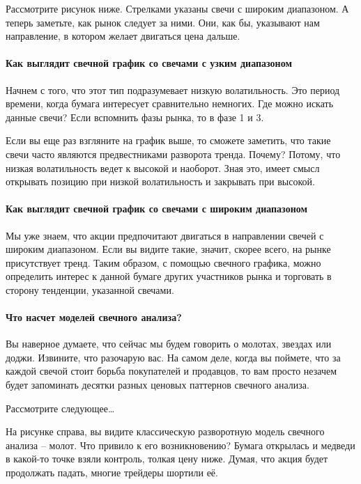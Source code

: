 \documentclass{book}
\begin{document}
Рассмотрите рисунок ниже. Стрелками указаны свечи с широким
диапазоном. А теперь заметьте, как рынок следует за ними. Они, как бы,
указывают нам направление, в котором желает двигаться цена дальше.

\paragraph{Как выглядит свечной график со свечами с узким диапазоном}

Начнем с того, что этот тип подразумевает низкую волатильность. Это период времени, когда бумага интересует сравнительно немногих. Где можно искать данные свечи? Если вспомнить фазы рынка, то в фазе 1 и 3.

Если вы еще раз взгляните на график выше, то сможете заметить, что
такие свечи часто являются предвестниками разворота тренда. Почему?
Потому, что низкая волатильность ведет к высокой и наоборот. Зная это,
имеет смысл открывать позицию при низкой волатильность и закрывать при
высокой.

\paragraph{Как выглядит свечной график со свечами с широким
  диапазоном}

Мы уже знаем, что акции предпочитают двигаться в направлении свечей с
широким диапазоном. Если вы видите такие, значит, скорее всего, на
рынке присутствует тренд. Таким образом, с помощью свечного графика,
можно определить интерес к данной бумаге других участников рынка и
торговать в сторону тенденции, указанной свечами.

\paragraph{Что насчет моделей свечного анализа?}

Вы наверное думаете, что сейчас мы будем говорить о молотах, звездах или доджи. Извините, что разочарую вас. На самом деле, когда вы поймете, что за каждой свечой стоит борьба покупателей и продавцов, то вам просто незачем будет запоминать десятки разных ценовых паттернов свечного анализа.

Рассмотрите следующее…

На рисунке справа, вы видите классическую разворотную модель свечного анализа – молот. Что привило к его возникновению? Бумага открылась и медведи в какой-то точке взяли контроль, толкая цену ниже. Думая, что акция будет продолжать падать, многие трейдеры шортили её.
\end{document}
